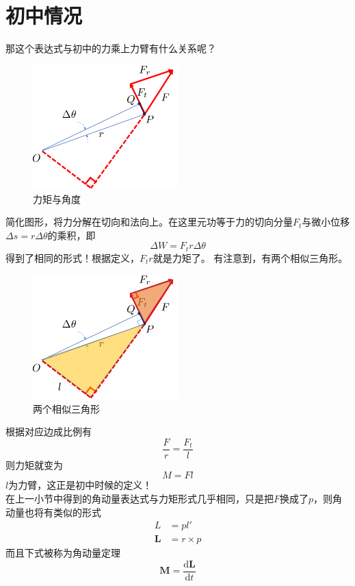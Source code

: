 \section{初中情况}
那这个表达式与初中的力乘上力臂有什么关系呢？
\begin{figure}
  \centering
  \includegraphics[width=0.5\textwidth]{pic3.png}
  \caption{力矩与角度}\label{3}
\end{figure}
简化图形，将力分解在切向和法向上。在这里元功等于力的切向分量$F_t$与微小位移$\Delta s=r \Delta \theta$的乘积，即
\begin{equation}
  \Delta W=F_t r \Delta \theta
\end{equation}
得到了相同的形式！根据定义，$F_t r$就是力矩了。
有注意到，有两个相似三角形。
\begin{figure}
  \centering
  \includegraphics[width=0.5\textwidth]{pic4.png}
  \caption{两个相似三角形}\label{4}
\end{figure}
根据对应边成比例有
\begin{equation}
\frac{F}{r}=\frac{F_t}{l}
\end{equation}
则力矩就变为
\begin{equation}
  M=Fl
\end{equation}
$l$为力臂，这正是初中时候的定义！\\
在上一小节中得到的角动量表达式与力矩形式几乎相同，只是把$F$换成了$p$，则角动量也将有类似的形式
\begin{align}\nonumber
  L &= pl' \\
   \bm{L}&= r\times p
\end{align}
而且下式被称为角动量定理
\begin{equation}
  \bm{M}=\frac{\textrm{d}\bm{L}}{\textrm{d}t}
\end{equation}

